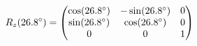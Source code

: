 \documentclass[preview]{standalone}
\begin{document}
\begin{align*}
\special{dvisvgm:raw <g id='unique000'>}R_z(26.8^\circ) = \begin{pmatrix} \cos(26.8^\circ) & -\sin(26.8^\circ) & 0 \\ \sin(26.8^\circ) & \cos(26.8^\circ) & 0 \\ 0 & 0 & 1 \end{pmatrix}\special{dvisvgm:raw </g>}
\end{align*}
\end{document}
